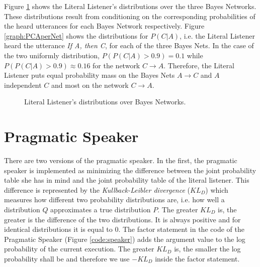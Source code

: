 Figure \ref{fig:LL-BN} shows the Literal Listener's distributions over the three Bayes Networks. These distributions result from conditioning on the corresponding probabilities of the heard utterances for each Bayes Network respectively. Figure \ref{graph:PCAperNet} shows the distributions for $P(C|A)$, i.e. the Literal Listener heard the utterance \textit{If A, then C}, for each of the three Bayes Nets. In the case of the two uniformly distribution, $P(P(C|A)>0.9)=0.1$ while $P(P(C|A)>0.9) \approx 0.16$ for the network $C \rightarrow A$. Therefore, the Literal Listener puts equal probability mass on the Bayes Nets $A \rightarrow C$ and $A$ independent $C$ and most on the network $C \rightarrow A$.


\begin{figure}[ht]
\centering
{}\qquad
{}

\qquad
{}

\caption{Literal Listener's distributions over Bayes Networks.}
\label{fig:LL-BN}
\end{figure}


\FloatBarrier
\section*{Pragmatic Speaker}

There are two versions of the pragmatic speaker. In the first, the pragmatic speaker is implemented as minimizing the difference between the joint probability table she has in mind and the joint probability table of the literal listener. This difference is represented by the \textit{Kullback-Leibler divergence} ($KL_D$) which measures how different two probability distributions are, i.e. how well a distribution $Q$ approximates a true distribution $P$. The greater $KL_D$ is, the greater is the difference of the two distributions. It is always positive and for identical distributions it is equal to 0. The factor statement in the code of the Pragmatic Speaker (Figure \ref{code:speaker}) adds the argument value to the log probability of the current execution. The greater $KL_D$ is, the smaller the log probability shall be and therefore we use $-KL_D$ inside the factor statement.

